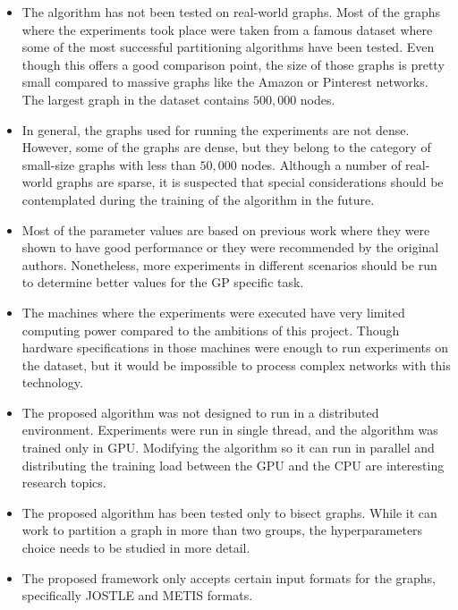 \begin{itemize}
    \item The algorithm has not been tested on real-world graphs. Most of the graphs where the experiments took place were taken from a famous dataset where some of the most successful partitioning algorithms have been tested. Even though this offers a good comparison point, the size of those graphs is pretty small compared to massive graphs like the Amazon or Pinterest networks. The largest graph in the dataset contains $500,000$ nodes.
    \item In general, the graphs used for running the experiments are not dense. However, some of the graphs are dense, but they belong to the category of small-size graphs with less than $50,000$ nodes. Although a number of real-world graphs are sparse, it is suspected that special considerations should be contemplated during the training of the algorithm in the future.
    \item Most of the parameter values are based on previous work where they were shown to have good performance or they were recommended by the original authors. Nonetheless, more experiments in different scenarios should be run to determine better values for the GP specific task.
    \item The machines where the experiments were executed have very limited computing power compared to the ambitions of this project. Though hardware specifications in those machines were enough to run experiments on the dataset, but it would be impossible to process complex networks with this technology.
    \item The proposed algorithm was not designed to run in a distributed environment. Experiments were run in single thread, and the algorithm was trained only in GPU. Modifying the algorithm so it can run in parallel and distributing the training load between the GPU and the CPU are interesting research topics. 
    \item The proposed algorithm has been tested only to bisect graphs. While it can work to partition a graph in more than two groups, the hyperparameters choice needs to be studied in more detail.
    \item The proposed framework only accepts certain input formats for the graphs, specifically JOSTLE and METIS formats.
\end{itemize}

